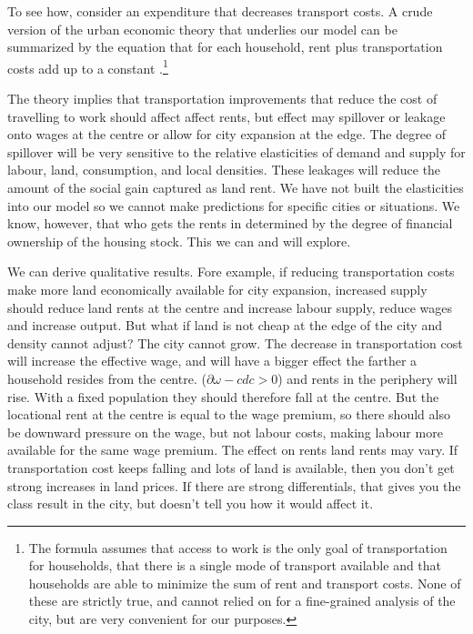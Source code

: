 To see how, consider an expenditure that decreases transport costs.  A crude version of the urban economic theory  that underlies our  model can be summarized by the equation that for each household, rent plus transportation costs add up to a constant \cite{sootTransportationCostsUrban1974c}.\footnote{The formula assumes that access to work is the only goal of transportation for households, that there is a single mode of transport available and that households are able to minimize the sum of rent and transport costs. None of these are strictly true, and cannot relied on for a fine-grained analysis of the city, but are very convenient for our purposes.} %


The theory implies that transportation improvements that reduce the cost of travelling to work should  affect affect rents, but effect may spillover or leakage  onto wages  at the centre or allow for city expansion at the edge.   The degree of spillover will be very sensitive to the relative elasticities of demand and supply  for labour, land, consumption, and local densities. These leakages will reduce the amount of the social gain captured as land rent. We  have not built the elasticities into our model so we cannot make predictions for specific cities or situations. We know, however, that who gets the rents in determined by the degree of financial ownership of  the housing stock. This we can and will explore. 

We can derive qualitative results. Fore example, if reducing transportation costs make more land economically available for city expansion, increased supply should reduce land rents at the centre and increase labour supply, reduce wages and increase output.  But what if land is not cheap at the edge of the city and density cannot adjust? The city cannot  grow. The decrease in transportation cost will increase  the effective wage, and will have a bigger effect the farther  a household resides from the centre. ($\partial{\omega-cd}{c}>0$) and rents in the periphery will rise. With a fixed population they should therefore fall at the centre. But the locational rent at the centre is equal to the wage premium, so there should also be downward pressure on the wage, but not labour costs, making labour more available for the same wage premium. The effect on rents land rents may vary. If transportation cost keeps falling and lots of land is available, then you don't get strong increases in land prices. If there are strong differentials, that gives you the class result in the city, but doesn't tell you how it would affect it. 

